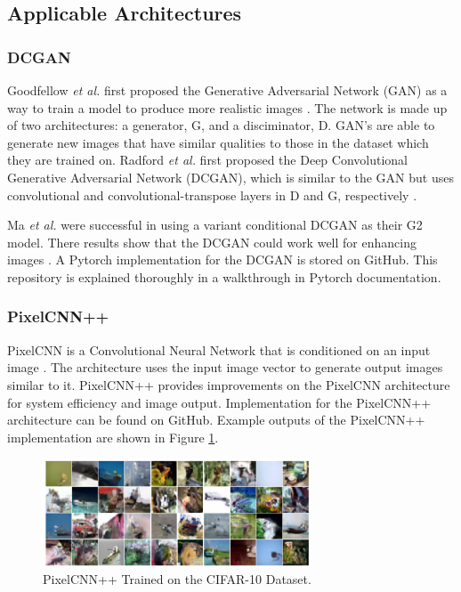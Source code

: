 \documentclass[letterpaper]{article} %
\begin{document}
\subsection{Applicable Architectures}
\subsubsection{DCGAN}
Goodfellow \textit{et al.} first proposed the Generative Adversarial Network (GAN)
as a way to train a model to produce more realistic images
\cite{generative_adversarial_networks}.
The network is made up of two architectures:
a generator, G, and a disciminator, D.
GAN's are able to generate new images that have similar qualities to
those in the dataset which they are trained on.
Radford \textit{et al.} first proposed the Deep Convolutional Generative Adversarial Network (DCGAN),
which is similar to the GAN
but uses convolutional and convolutional-transpose layers in D and G, respectively
\cite{unsupervised_learning}.

Ma \textit{et al.} were successful in using
a variant conditional DCGAN as their G2 model.
There results show that the DCGAN could work well
for enhancing images
\cite{pose_guided_image_generation}.
A Pytorch implementation for the DCGAN is stored on GitHub.
This repository is explained thoroughly in a walkthrough
in Pytorch documentation.

\subsubsection{PixelCNN++}
PixelCNN is a Convolutional Neural Network that is conditioned on an input image
\cite{conditional_image_generation}.
The architecture uses the input image vector to generate output images similar to it.
PixelCNN++ \cite{pixelcnn++} provides improvements on the
PixelCNN architecture
for system efficiency and image output.
Implementation for the PixelCNN++ architecture can be found on GitHub.
Example outputs of the PixelCNN++ implementation are shown in Figure \ref{fig:pixelcnn++}.

\begin{figure}[htbp]
\centerline{\includegraphics[width=8cm]{pixelcnn++.png}}
\caption{PixelCNN++ Trained on the CIFAR-10 Dataset\cite{pixelcnn++}.}
\label{fig:pixelcnn++}
\end{figure}
\end{document}
